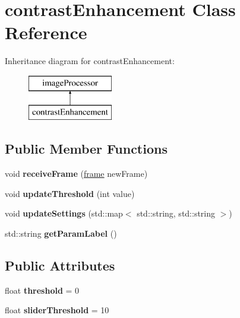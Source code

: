 \hypertarget{classcontrast_enhancement}{}\section{contrast\+Enhancement Class Reference}
\label{classcontrast_enhancement}
Inheritance diagram for contrast\+Enhancement\+:\begin{figure}[H]
\begin{center}
\leavevmode
\includegraphics[height=2.000000cm]{classcontrast_enhancement}
\end{center}
\end{figure}
\subsection*{Public Member Functions}
\begin{DoxyCompactItemize}
\item 
void {\bfseries receive\+Frame} (\hyperlink{classframe}{frame} new\+Frame)\hypertarget{classcontrast_enhancement_a2b1c35061a4e24e29f757284ad94327f}{}\label{classcontrast_enhancement_a2b1c35061a4e24e29f757284ad94327f}

\item 
void {\bfseries update\+Threshold} (int value)\hypertarget{classcontrast_enhancement_aa98d801afd8448167834b19eb582db57}{}\label{classcontrast_enhancement_aa98d801afd8448167834b19eb582db57}

\item 
void {\bfseries update\+Settings} (std\+::map$<$ std\+::string, std\+::string $>$)\hypertarget{classcontrast_enhancement_abddfdb4dfb9d762b3a8da187688d2002}{}\label{classcontrast_enhancement_abddfdb4dfb9d762b3a8da187688d2002}

\item 
std\+::string {\bfseries get\+Param\+Label} ()\hypertarget{classcontrast_enhancement_a08c202cd0a1d9dbd7974b6273f0f6ade}{}\label{classcontrast_enhancement_a08c202cd0a1d9dbd7974b6273f0f6ade}

\end{DoxyCompactItemize}
\subsection*{Public Attributes}
\begin{DoxyCompactItemize}
\item 
float {\bfseries threshold} = 0\hypertarget{classcontrast_enhancement_a83f21a927926197fde712d00cf37368d}{}\label{classcontrast_enhancement_a83f21a927926197fde712d00cf37368d}

\item 
float {\bfseries slider\+Threshold} = 10\hypertarget{classcontrast_enhancement_a32768f79d77cd5803078fc5ce97a9230}{}\label{classcontrast_enhancement_a32768f79d77cd5803078fc5ce97a9230}

\end{DoxyCompactItemize}
